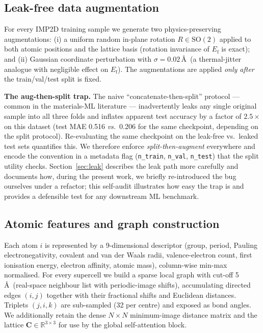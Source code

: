 \documentclass[11pt,a4paper]{article}
\begin{document}
\subsection{Leak-free data augmentation}
For every IMP2D training sample we generate two physics-preserving
augmentations: (i) a uniform random in-plane rotation
$R \in \mathrm{SO}(2)$ applied to both atomic positions and the
lattice basis (rotation invariance of $E_{\mathrm{f}}$ is exact); and
(ii) Gaussian coordinate perturbation with $\sigma = 0.02$\,\AA\
(a thermal-jitter analogue with negligible effect on
$E_{\mathrm{f}}$). The augmentations are applied \emph{only after}
the train/val/test split is fixed.

\textbf{The aug-then-split trap.} The naive
``concatenate-then-split'' protocol --- common in the materials-ML
literature --- inadvertently leaks any single original sample into
all three folds and inflates apparent test accuracy by a factor of
$2.5\times$ on this dataset (test MAE 0.516 \emph{vs.}\ 0.206 for
the same checkpoint, depending on the split protocol). Re-evaluating
the same checkpoint on the leak-free vs.\ leaked test sets quantifies
this. We therefore enforce \emph{split-then-augment} everywhere and
encode the convention in a metadata flag (\texttt{n\_train},
\texttt{n\_val}, \texttt{n\_test}) that the split utility checks.
Section~\ref{sec:leak} describes the leak path more carefully and
documents how, during the present work, we briefly re-introduced the
bug ourselves under a refactor; this self-audit illustrates how easy
the trap is and provides a defensible test for any downstream ML
benchmark.

\subsection{Atomic features and graph construction}
Each atom $i$ is represented by a 9-dimensional descriptor (group,
period, Pauling electronegativity, covalent and van der Waals radii,
valence-electron count, first ionisation energy, electron affinity,
atomic mass), column-wise min-max normalised. For every supercell we
build a sparse local graph with cut-off 5\,\AA\ (real-space neighbour
list with periodic-image shifts), accumulating directed edges
$(i, j)$ together with their fractional shifts and Euclidean
distances. Triplets $(j, i, k)$ are sub-sampled (32 per centre) and
exposed as bond angles. We additionally retain the dense $N \times N$
minimum-image distance matrix and the lattice
$\mathbf{C} \in \mathbb{R}^{3 \times 3}$ for use by the global
self-attention block.
\end{document}
